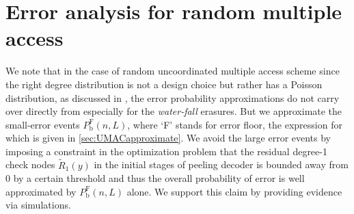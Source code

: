 
\section{Error analysis for random multiple access}
  We note that in the case of random uncoordinated multiple access scheme since the right degree distribution is not a design choice but rather has a Poisson distribution, as discussed in \cite{narayanan2012iterative}, the error probability approximations do not carry over directly from \cite{amraoui2007find} especially for the \textit{water-fall} erasures. But we approximate the small-error events $P_{\text{b}}^{\text{F}}(n,L)$, where `F' stands for error floor, the expression for which is given in \ref{sec:UMACapproximate}. We avoid the large error events by imposing a constraint in the optimization problem that the residual degree-1 check nodes $\tilde{R}_1(y)$ in the initial stages of peeling decoder is bounded away from $0$ by a certain threshold and thus the overall probability of error is well approximated by $P_{\text{b}}^{\text{F}}(n,L)$ alone. We support this claim by providing evidence via simulations.


